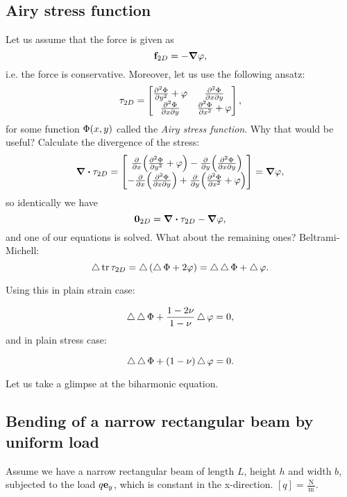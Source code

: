 \documentclass[reqno, a4paper]{article}
\begin{document}
\subsection{Airy stress function}
\label{sec:airy_stress_function}

Let us assume that the force is given as
\[
	\vb{f}_{2D} = - \grad \varphi,
\]
i.e. the force is conservative. Moreover, let us use the following ansatz:
\[
	\tensorq{\tau}_{2D}= \begin{bmatrix}
		\pdv[2]{\Phi}{y} + \varphi & \pdv[2]{\Phi}{x}{y} \\
		\pdv[2]{\Phi}{x}{y} & \pdv[2]{\Phi}{x} + \varphi
	\end{bmatrix},
\]
for some function $\Phi\qty(x,y)$ called the \textit{Airy stress function}. Why that would be useful? Calculate the divergence of the stress:
\[
	\divergence{\tensorq{\tau}_{2D}} = \begin{bmatrix}
		\pdv{x}\qty(\pdv[2]{\Phi}{y}+\varphi) - \pdv{y}\qty(\pdv[2]{\Phi}{x}{y}) \\
		-\pdv{x}\qty(\pdv[2]{\Phi}{x}{y}) + \pdv{y}\qty(\pdv[2]{\Phi}{x}+\varphi)
	\end{bmatrix}
	= \grad \varphi,
\]
so identically we have
\[
	\vb{0}_{2D} = \divergence{\tensorq{\tau}_{2D}} - \grad \varphi,
\]
and one of our equations is solved. What about the remaining ones? Beltrami-Michell:
\[
	\laplace \tr \tensorq{\tau}_{2D} = \laplace\qty(\laplace \Phi+2 \varphi) = \laplace \laplace \Phi + \laplace \varphi.
\]

Using this in plain strain case:

\[
	\laplace \laplace \Phi + \frac{1-2 \nu}{1-\nu}\laplace \varphi = 0,
\]
and in plain stress case:

\[
	\laplace \laplace \Phi + \qty(1- \nu)\laplace \varphi = 0.
\]

Let us take a glimpse at the biharmonic equation.
\subsection{Bending of a narrow rectangular beam by uniform load}
\label{sec:beam_uniform}
Assume we have a narrow rectangular beam of length $L$, height $h$ and width $b$, subjected to the load $q \vb{e}_y$, which is constant in the x-direction. $[q] = \frac{\, \text{N} \,}{\, \text{m} \,}$.

\begin{tikzpicture}
\end{tikzpicture}
\end{document}
